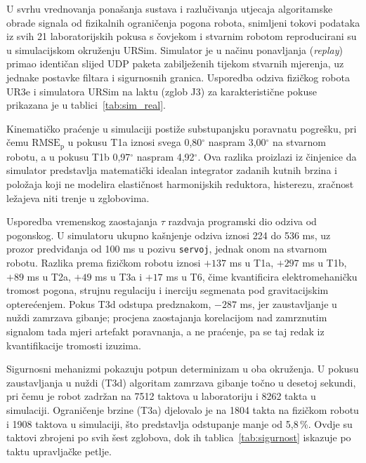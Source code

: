 U svrhu vrednovanja ponašanja sustava i razlučivanja utjecaja algoritamske obrade signala od fizikalnih ograničenja pogona robota, snimljeni tokovi podataka iz svih 21 laboratorijskih pokusa s čovjekom i stvarnim robotom reproducirani su u simulacijskom okruženju URSim. Simulator je u načinu ponavljanja (\textit{replay}) primao identičan slijed UDP paketa zabilježenih tijekom stvarnih mjerenja, uz jednake postavke filtara i sigurnosnih granica. Usporedba odziva fizičkog robota UR3e i simulatora URSim na laktu (zglob J3) za karakteristične pokuse prikazana je u tablici~\ref{tab:sim_real}.

\begin{table}[htbp]
  \caption{Usporedba odziva fizičkog robota UR3e i simulatora URSim na zglobu J3 za karakteristične pokuse. Prikazane su poravnate pogreške $\text{RMSE}_\text{p}$, vremenska zaostajanja $\tau$ i koeficijenti korelacije $r$.}
  \label{tab:sim_real}
  \centering\small
  
\end{table}

Kinematičko praćenje u simulaciji postiže substupanjsku poravnatu pogrešku, pri čemu $\text{RMSE}_\text{p}$ u pokusu T1a iznosi svega 0,80$^\circ$ naspram 3,00$^\circ$ na stvarnom robotu, a u pokusu T1b 0,97$^\circ$ naspram 4,92$^\circ$. Ova razlika proizlazi iz činjenice da simulator predstavlja matematički idealan integrator zadanih kutnih brzina i položaja koji ne modelira elastičnost harmonijskih reduktora, histerezu, zračnost ležajeva niti trenje u zglobovima.

Usporedba vremenskog zaostajanja $\tau$ razdvaja programski dio odziva od pogonskog. U simulatoru ukupno kašnjenje odziva iznosi 224 do 536 ms, uz prozor predviđanja od 100 ms u pozivu \texttt{servoj}, jednak onom na stvarnom robotu. Razlika prema fizičkom robotu iznosi $+137$ ms u T1a, $+297$ ms u T1b, $+89$ ms u T2a, $+49$ ms u T3a i $+17$ ms u T6, čime kvantificira elektromehaničku tromost pogona, strujnu regulaciju i inerciju segmenata pod gravitacijskim opterećenjem. Pokus T3d odstupa predznakom, $-287$ ms, jer zaustavljanje u nuždi zamrzava gibanje; procjena zaostajanja korelacijom nad zamrznutim signalom tada mjeri artefakt poravnanja, a ne praćenje, pa se taj redak iz kvantifikacije tromosti izuzima.

Sigurnosni mehanizmi pokazuju potpun determinizam u oba okruženja. U pokusu zaustavljanja u nuždi (T3d) algoritam zamrzava gibanje točno u desetoj sekundi, pri čemu je robot zadržan na 7512 taktova u laboratoriju i 8262 takta u simulaciji. Ograničenje brzine (T3a) djelovalo je na 1804 takta na fizičkom robotu i 1908 taktova u simulaciji, što predstavlja odstupanje manje od 5,8\,\%. Ovdje su taktovi zbrojeni po svih šest zglobova, dok ih tablica~\ref{tab:sigurnost} iskazuje po taktu upravljačke petlje.

